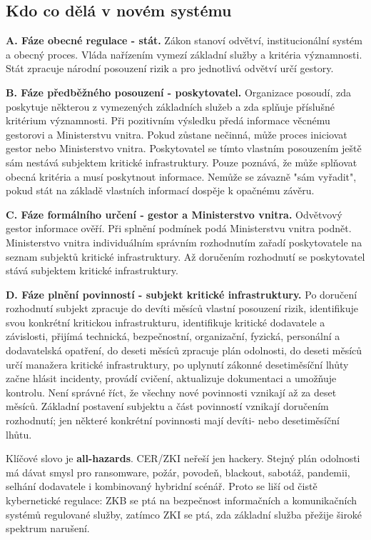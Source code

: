 \documentclass[11pt,a4paper]{article}
\begin{document}
\subsection*{Kdo co dělá v novém systému}
\textbf{A. Fáze obecné regulace - stát.} Zákon stanoví odvětví, institucionální systém a obecný proces. Vláda nařízením vymezí základní služby a kritéria významnosti. Stát zpracuje národní posouzení rizik a pro jednotlivá odvětví určí gestory.

\textbf{B. Fáze předběžného posouzení - poskytovatel.} Organizace posoudí, zda poskytuje některou z vymezených základních služeb a zda splňuje příslušné kritérium významnosti. Při pozitivním výsledku předá informace věcnému gestorovi a Ministerstvu vnitra. Pokud zůstane nečinná, může proces iniciovat gestor nebo Ministerstvo vnitra. Poskytovatel se tímto vlastním posouzením ještě sám nestává subjektem kritické infrastruktury. Pouze poznává, že může splňovat obecná kritéria a musí poskytnout informace. Nemůže se závazně "sám vyřadit", pokud stát na základě vlastních informací dospěje k opačnému závěru.

\textbf{C. Fáze formálního určení - gestor a Ministerstvo vnitra.} Odvětvový gestor informace ověří. Při splnění podmínek podá Ministerstvu vnitra podnět. Ministerstvo vnitra individuálním správním rozhodnutím zařadí poskytovatele na seznam subjektů kritické infrastruktury. Až doručením rozhodnutí se poskytovatel stává subjektem kritické infrastruktury.

\textbf{D. Fáze plnění povinností - subjekt kritické infrastruktury.} Po doručení rozhodnutí subjekt zpracuje do devíti měsíců vlastní posouzení rizik, identifikuje svou konkrétní kritickou infrastrukturu, identifikuje kritické dodavatele a závislosti, přijímá technická, bezpečnostní, organizační, fyzická, personální a dodavatelská opatření, do deseti měsíců zpracuje plán odolnosti, do deseti měsíců určí manažera kritické infrastruktury, po uplynutí zákonné desetiměsíční lhůty začne hlásit incidenty, provádí cvičení, aktualizuje dokumentaci a umožňuje kontrolu. Není správné říct, že všechny nové povinnosti vznikají až za deset měsíců. Základní postavení subjektu a část povinností vznikají doručením rozhodnutí; jen některé konkrétní povinnosti mají devíti- nebo desetiměsíční lhůtu.

Klíčové slovo je \textbf{all-hazards}. CER/ZKI neřeší jen hackery. Stejný plán odolnosti má dávat smysl pro ransomware, požár, povodeň, blackout, sabotáž, pandemii, selhání dodavatele i kombinovaný hybridní scénář. Proto se liší od čistě kybernetické regulace: ZKB se ptá na bezpečnost informačních a komunikačních systémů regulované služby, zatímco ZKI se ptá, zda základní služba přežije široké spektrum narušení.
\end{document}
